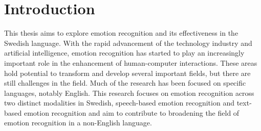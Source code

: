 \chapter{Introduction}
This thesis aims to explore emotion recognition and its effectiveness in the Swedish language. With the rapid advancement of the technology industry and artificial intelligence, emotion recognition has started to play an increasingly important role in the enhancement of human-computer interactions. These areas hold potential to transform and develop several important fields, but there are still challenges in the field. Much of the research has been focused on specific languages, notably English. This research focuses on emotion recognition across two distinct modalities in Swedish, speech-based emotion recognition and text-based emotion recognition and aim to contribute to broadening the field of emotion recognition in a non-English language.

